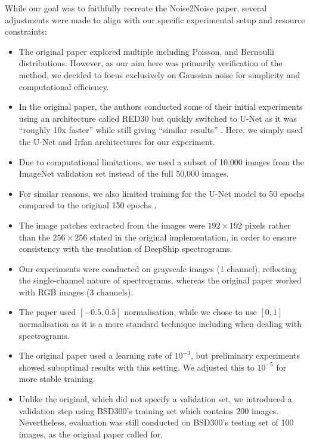 While our goal was to faithfully recreate the Noise2Noise paper, several adjustments were made to align with our specific experimental setup and resource constraints:
\begin{itemize}
    \item The original paper explored multiple including Poisson, and Bernoulli distributions. However, as our aim here was primarily verification of the method, we decided to focus exclusively on Gaussian noise for simplicity and computational efficiency.
    \item In the original paper, the authors conducted some of their initial experiments using an architecture called RED30 \cite{mao_image_2016} but quickly switched to U-Net as it was ``roughly 10x faster'' while still giving ``similar results'' \cite[3]{ronneberger_u-net_2015}. Here, we simply used the U-Net and Irfan architectures for our experiment.
    \item Due to computational limitations, we used a subset of 10,000 images from the ImageNet validation set instead of the full 50,000 images. 
    \item For similar reasons, we also limited training for the U-Net model to 50 epochs compared to the original 150 epochs \cite[Fig 1.]{lehtinen_noise2noise_2018}. 
    \item The image patches extracted from the images were $192 \times 192$ pixels rather than the $256 \times 256$ stated in the original implementation, in order to ensure consistency with the resolution of DeepShip spectrograms.
    \item Our experiments were conducted on grayscale images (1 channel), reflecting the single-channel nature of spectrograms, whereas the original paper worked with RGB images (3 channels).
    \item The paper used $[-0.5, 0.5]$ normalisation, while we chose to use $[0, 1]$ normalisation as it is a more standard technique including when dealing with spectrograms.
    \item The original paper used a learning rate of $10^{-3}$, but preliminary experiments showed suboptimal results with this setting. We adjusted this to $10^{-5}$ for more stable training.
    \item Unlike the original, which did not specify a validation set, we introduced a validation step using BSD300's training set which contains 200 images. Nevertheless, evaluation was still conducted on BSD300's testing set of 100 images, as the original paper called for.
\end{itemize}

